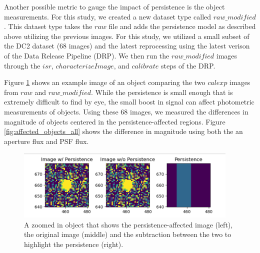 \documentclass[DM,authoryear,toc]{lsstdoc}
\begin{document}
Another possible metric to gauge the impact of persistence is the object measurements.
For this study, we created a new dataset type called \texttt{$raw\_modified$}. 
This dataset type takes the \texttt{$raw$} file and adds the persistence model as described above utilizing the previous images.
For this study, we utilized a small subset of the DC2 dataset (68 images) and the latest reprocessing using the latest verison of the Data Release Pipeline (DRP).
We then run the \texttt{$raw\_modified$} images through the \texttt{$isr$}, \texttt{$characterizeImage$}, and \texttt{$calibrate$} steps of the DRP\@. 

Figure \ref{fig:ex_persistence} shows an example image of an object comparing the two \texttt{$calexp$} images from \texttt{$raw$} and \texttt{$raw\_modified$}.
While the persistence is small enough that is extremely difficult to find by eye, the small boost in signal can affect photometric measurements of objects.
Using these 68 images, we measured the differences in magnitude of objects centered in the persistence-affected regions.
Figure \ref{fig:affected_objects_all} shows the difference in magnitude using both the an aperture flux and PSF flux.

\begin{figure}[!htp]
  \centering
  \includegraphics[width=0.95\textwidth, angle=0]{Obj_pers.png}
  \caption{
  A zoomed in object that shows the persistence-affected image (left), the original image (middle) 
  and the subtraction between the two to highlight the persistence (right).
  }\label{fig:ex_persistence}
\end{figure}
\end{document}
